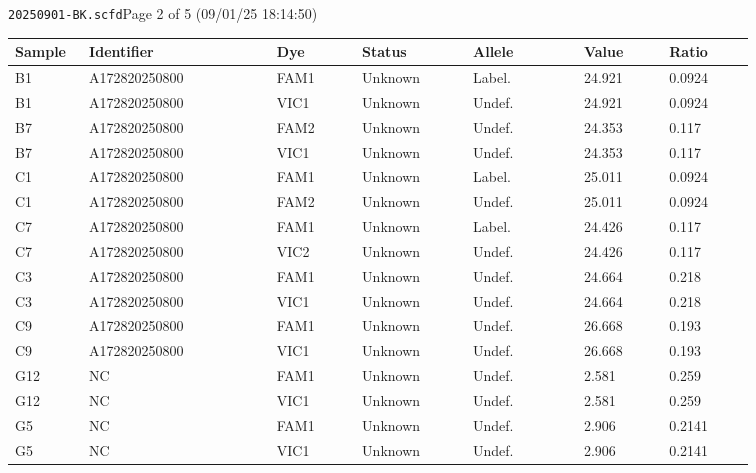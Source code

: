\documentclass[UTF8,10pt,a4paper,fontset=fandol]{ctexart}
\begin{document}

\vfill

\noindent\texttt{20250901-BK.scfd}\hfill Page 2 of 5 (09/01/25 18:14:50)

\newpage

\begin{center}
\small
\begin{tabular}{p{0.08\linewidth}p{0.22\linewidth}p{0.10\linewidth}p{0.13\linewidth}p{0.13\linewidth}p{0.10\linewidth}p{0.10\linewidth}}
\textbf{Sample} & \textbf{Identifier} & \textbf{Dye} & \textbf{Status} & \textbf{Allele} & \textbf{Value} & \textbf{Ratio}\\
\hline
B1 & A172820250800 & FAM1 & Unknown & Label. & 24.921 & 0.0924\\
B1 & A172820250800 & VIC1 & Unknown & Undef. & 24.921 & 0.0924\\
B7 & A172820250800 & FAM2 & Unknown & Undef. & 24.353 & 0.117\\
B7 & A172820250800 & VIC1 & Unknown & Undef. & 24.353 & 0.117\\
C1 & A172820250800 & FAM1 & Unknown & Label. & 25.011 & 0.0924\\
C1 & A172820250800 & FAM2 & Unknown & Undef. & 25.011 & 0.0924\\
C7 & A172820250800 & FAM1 & Unknown & Label. & 24.426 & 0.117\\
C7 & A172820250800 & VIC2 & Unknown & Undef. & 24.426 & 0.117\\
C3 & A172820250800 & FAM1 & Unknown & Undef. & 24.664 & 0.218\\
C3 & A172820250800 & VIC1 & Unknown & Undef. & 24.664 & 0.218\\
C9 & A172820250800 & FAM1 & Unknown & Undef. & 26.668 & 0.193\\
C9 & A172820250800 & VIC1 & Unknown & Undef. & 26.668 & 0.193\\
G12 & NC & FAM1 & Unknown & Undef. & 2.581 & 0.259\\
G12 & NC & VIC1 & Unknown & Undef. & 2.581 & 0.259\\
G5 & NC & FAM1 & Unknown & Undef. & 2.906 & 0.2141\\
G5 & NC & VIC1 & Unknown & Undef. & 2.906 & 0.2141\\

\end{tabular}
\end{center}
\end{document}
